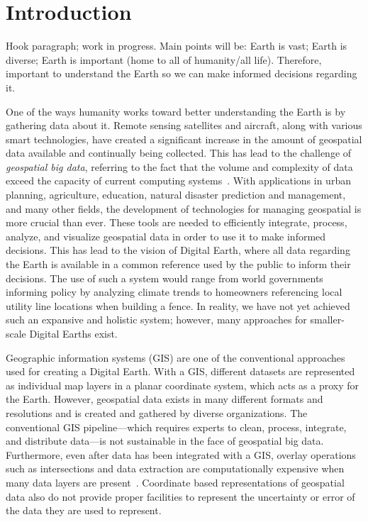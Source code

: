 \chapter{Introduction} \label{chap:introduction}
Hook paragraph; work in progress.
Main points will be:
Earth is vast;
Earth is diverse;
Earth is important (home to all of humanity/all life).
Therefore, important to understand the Earth so we can make informed decisions regarding it.



One of the ways humanity works toward better understanding the Earth is by gathering data about it.
Remote sensing satellites and aircraft, along with various smart technologies, have created a significant increase in the amount of geospatial data available and continually being collected.
This has lead to the challenge of \textit{geospatial big data}, referring to the fact that the volume and complexity of data exceed the capacity of current computing systems~\cite{lee2015geospatial}.
With applications in urban planning, agriculture, education, natural disaster prediction and management, and many other fields, the development of technologies for managing geospatial is more crucial than ever.
These tools are needed to efficiently integrate, process, analyze, and visualize geospatial data in order to use it to make informed decisions.
This has lead to the vision of Digital Earth, where all data regarding the Earth is available in a common reference used by the public to inform their decisions.
The use of such a system would range from world governments informing policy by analyzing climate trends to homeowners referencing local utility line locations when building a fence.
In reality, we have not yet achieved such an expansive and holistic system; however, many approaches for smaller-scale Digital Earths exist.


Geographic information systems (GIS) are one of the conventional approaches used for creating a Digital Earth.
With a GIS, different datasets are represented as individual map layers in a planar coordinate system, which acts as a proxy for the Earth.
However, geospatial data exists in many different formats and resolutions and is created and gathered by diverse organizations.
The conventional GIS pipeline---which requires experts to clean, process, integrate, and distribute data---is not sustainable in the face of geospatial big data.
Furthermore, even after data has been integrated with a GIS, overlay operations such as intersections and data extraction are computationally expensive when many data layers are present~\cite{wang2015improving}.
Coordinate based representations of geospatial data also do not provide proper facilities to represent the uncertainty or error of the data they are used to represent.


